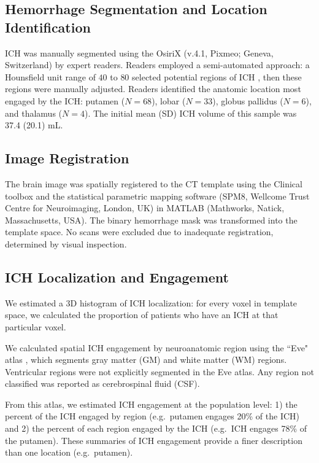 \subsection{Hemorrhage Segmentation and Location Identification}
ICH was manually segmented using the OsiriX (v.4.1, Pixmeo; Geneva, Switzerland) by expert readers.  Readers employed a semi-automated approach: a Hounsfield unit range of $40$ to $80$ selected potential regions of ICH \citep{bergstrom_variation_1977, smith_imaging_2006}, then these regions were manually adjusted. Readers identified the anatomic location most engaged by the ICH: putamen ($N{=}68$), lobar ($N{=}33$), globus pallidus ($N{=}6$), and thalamus ($N{=}4$).  The initial mean (SD) ICH volume of this sample was 37.4 (20.1) mL.


\subsection{Image Registration}
The brain image was spatially registered to the CT template using the Clinical toolbox \citep{rorden_age-specific_2012} and the statistical parametric mapping software (SPM8, Wellcome Trust Centre for Neuroimaging, London, UK) in MATLAB (Mathworks, Natick, Massachusetts, USA).  The binary hemorrhage mask was transformed into the template space. No scans were excluded due to inadequate registration, determined by visual inspection.


\subsection{ICH Localization and Engagement}
\label{sec:engage}
We estimated a 3D histogram of ICH localization: for every voxel in template space, we calculated the proportion of patients who have an ICH at that particular voxel.  
 
We calculated spatial ICH engagement by neuroanatomic region using the ``Eve" atlas \citep{oishi_human_2008}, which segments gray matter (GM) and white matter (WM) regions.  
Ventricular regions were not explicitly segmented in the Eve atlas.  Any region not classified was reported as cerebrospinal fluid (CSF).


From this atlas, we estimated ICH engagement at the population level: 1) the percent of the ICH engaged by region (e.g.~putamen engages 20\% of the ICH) and 2) the percent of each region engaged by the ICH (e.g.~ICH engages 78\% of the putamen).  These summaries of ICH engagement provide a finer description than one location (e.g.~putamen).  

